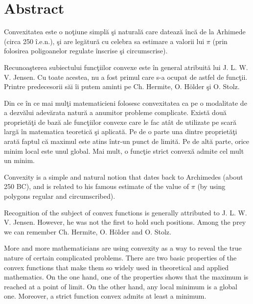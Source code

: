 \documentclass[a4paper,12pt,oneside]{report}
\begin{document}
\maketitle

\tableofcontents
\listoffigures

\newpage
{}


\chapter*{Abstract}

Convexitatea este o no\c{t}iune simpl\u{a} \c{s}i natural\u{a} care dateaz\u{a} \^{i}nc\u{a} de la Arhimede (circa 250 \^{i}.e.n.), \c{s}i are leg\u{a}tur\u{a} cu celebra sa estimare a valorii lui \(\pi\) (prin folosirea poligoanelor regulate \^{i}nscrise \c{s}i circumscrise).

Recunoa\c{s}terea subiectului func\c{t}iilor convexe este \^{i}n general atribuit\u{a} lui J. L. W. V. Jensen. Cu toate acestea, nu a fost primul care s-a ocupat de astfel de func\c{t}ii. Printre predecesorii s\u{a}i \^{i}i putem aminti pe Ch. Hermite, O. Hölder \c{s}i O. Stolz.

Din ce \^{i}n ce mai mul\c{t}i matematicieni folosesc convexitatea ca pe o modalitate de a dezv\u{a}lui adev\u{a}rata natur\u{a} a anumitor probleme complicate. Exist\u{a} dou\u{a} propriet\u{a}\c{t}i de baz\u{a} ale func\c{t}iilor convexe care le fac at\^{a}t de utilizate pe scar\u{a} larg\u{a} \^{i}n matematica teoretic\u{a} \c{s}i aplicat\u{a}. Pe de o parte una dintre propriet\u{a}\c{t}i arat\u{a} faptul c\u{a} maximul este atins \^{i}ntr-un punct de limit\u{a}. Pe de alt\u{a} parte, orice minim local este unul global. Mai mult, o func\c{t}ie strict convex\u{a} admite cel mult un minim.

Convexity is a simple and  natural notion that dates back to Archimedes (about
250 BC), and is related to his famous estimate of the value of \(\pi\)  (by using polygons
regular and circumscribed).

Recognition of the subject of convex functions is generally attributed to J. L. W. V.
Jensen. However, he was not the first to hold such positions. Among the prey we can remember Ch. Hermite, O. Hölder and O. Stolz.

More and more mathematicians are using convexity as a way to
reveal the true nature of certain complicated problems. There are two basic properties
of the convex functions that make them so widely used in theoretical and applied mathematics. On the one hand, one of the properties shows that the maximum is reached at a point
of limit. On the other hand, any local minimum is a global one. Moreover, a strict function
convex admits at least a minimum.
\end{document}
